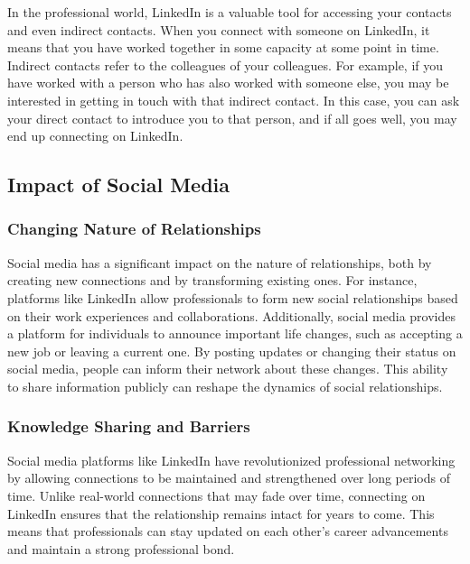 In the professional world, LinkedIn is a valuable tool for accessing
your contacts and even indirect contacts. When you connect with someone
on LinkedIn, it means that you have worked together in some capacity at
some point in time. Indirect contacts refer to the colleagues of your
colleagues. For example, if you have worked with a person who has also
worked with someone else, you may be interested in getting in touch with
that indirect contact. In this case, you can ask your direct contact to
introduce you to that person, and if all goes well, you may end up
connecting on LinkedIn.

\subsection{Impact of Social Media}\label{impact-of-social-media}

\subsubsection{Changing Nature of
  Relationships}\label{changing-nature-of-relationships}

Social media has a significant impact on the nature of relationships,
both by creating new connections and by transforming existing ones. For
instance, platforms like LinkedIn allow professionals to form new social
relationships based on their work experiences and collaborations.
Additionally, social media provides a platform for individuals to
announce important life changes, such as accepting a new job or leaving
a current one. By posting updates or changing their status on social
media, people can inform their network about these changes. This ability
to share information publicly can reshape the dynamics of social
relationships.

\subsubsection{Knowledge Sharing and
  Barriers}\label{knowledge-sharing-and-barriers}

Social media platforms like LinkedIn have revolutionized professional
networking by allowing connections to be maintained and strengthened
over long periods of time. Unlike real-world connections that may fade
over time, connecting on LinkedIn ensures that the relationship remains
intact for years to come. This means that professionals can stay updated
on each other's career advancements and maintain a strong professional
bond.


